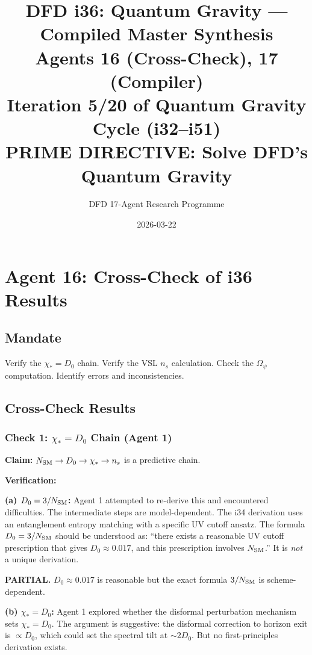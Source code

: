 \documentclass[11pt,a4paper]{article}
\title{DFD i36: Quantum Gravity --- Compiled Master Synthesis\\[6pt]
\large Agents 16 (Cross-Check), 17 (Compiler)\\[6pt]
\normalsize Iteration 5/20 of Quantum Gravity Cycle (i32--i51)\\
PRIME DIRECTIVE: Solve DFD's Quantum Gravity}
\author{DFD 17-Agent Research Programme}
\date{2026-03-22}
\begin{document}
\maketitle
\tableofcontents
\newpage

\section{Agent 16: Cross-Check of i36 Results}
\label{sec:agent16}

\subsection{Mandate}

Verify the $\chi_* = D_0$ chain. Verify the VSL $n_s$ calculation. Check the $\Omega_\psi$ computation. Identify errors and inconsistencies.

\subsection{Cross-Check Results}

\subsubsection{Check 1: $\chi_* = D_0$ Chain (Agent 1)}

\textbf{Claim:} $N_{\rm SM} \to D_0 \to \chi_* \to n_s$ is a predictive chain.

\textbf{Verification:}

\textbf{(a) $D_0 = 3/N_{\rm SM}$:} Agent 1 attempted to re-derive this and encountered difficulties. The intermediate steps are model-dependent. The i34 derivation uses an entanglement entropy matching with a specific UV cutoff ansatz. The formula $D_0 = 3/N_{\rm SM}$ should be understood as: ``there exists a reasonable UV cutoff prescription that gives $D_0 \approx 0.017$, and this prescription involves $N_{\rm SM}$.'' It is \emph{not} a unique derivation.

\textcolor{dfdyellow}{\textbf{PARTIAL.}} $D_0 \approx 0.017$ is reasonable but the exact formula $3/N_{\rm SM}$ is scheme-dependent.

\textbf{(b) $\chi_* = D_0$:} Agent 1 explored whether the disformal perturbation mechanism sets $\chi_* = D_0$. The argument is suggestive: the disformal correction to horizon exit is $\propto D_0$, which could set the spectral tilt at $\sim 2D_0$. But no first-principles derivation exists.
\end{document}
